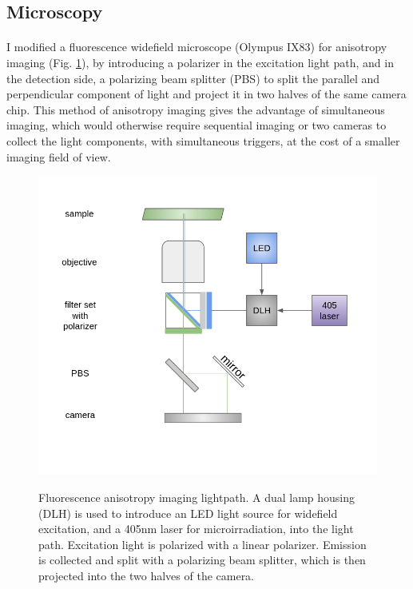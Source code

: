 \subsection{Microscopy}
\paragraph*{} I modified a fluorescence widefield microscope (Olympus IX83) for anisotropy imaging (Fig. \ref{fig:setup}), by introducing a polarizer in the excitation light path, and in the detection side, a polarizing beam splitter (PBS) to split the parallel and perpendicular component of light and project it in two halves of the same camera chip. This method of anisotropy imaging gives the advantage of simultaneous imaging, which would otherwise require sequential imaging or two cameras to collect the light components, with simultaneous triggers, at the cost of a smaller imaging field of view. 
\begin{figure}[!htp]
    {\hfill\includegraphics[trim=0 50 0 60,clip,width=0.8\linewidth]{figures/setup.png}\hspace*{\fill}}
    \caption{Fluorescence anisotropy imaging lightpath. A dual lamp housing (DLH) is used to introduce an LED light source for widefield excitation, and a 405nm laser for microirradiation, into the light path. Excitation light is polarized with a linear polarizer. Emission is collected and split with a polarizing beam splitter, which is then projected into the two halves of the camera.}
    {\label{fig:setup}}
\end{figure}

